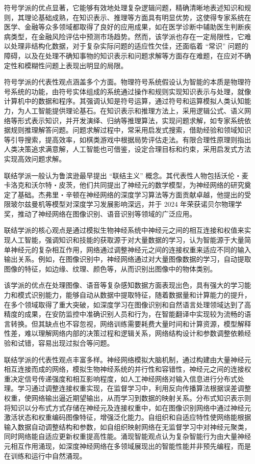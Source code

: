 符号学派的优点显著，它能够有效地处理复杂逻辑问题，精确清晰地表述知识和规则，其理论基础成熟，在知识表示、推理等方面具有明显优势，这使得专家系统在医学、金融等众多领域都取得了良好的应用成果，如在医学诊断中辅助医生判断疾病类型，在金融风险评估中预测市场趋势。然而，该学派也存在一定局限性，它难以处理非结构化数据，对于复杂实际问题的适应性欠佳，还面临着 “常识” 问题的障碍，以及在处理不确知事物的知识表示和问题求解等方面存在难题，在应对不确定性和模糊性问题上表现出明显的局限。


符号学派的代表性观点涵盖多个方面。物理符号系统假设认为智能的本质是物理符号系统的功能，由符号实体组成的系统通过操作和规则实现知识表示与处理，就像计算机中的数据和程序。其强调认知是符号运算，通过符号和运算模拟人类认知能力，为人工智能提供理论基石。在知识表示和推理方法上，采用逻辑公式、语义网络等形式表示知识，并开发演绎、归纳等推理算法，实现问题求解，如专家系统依据规则推理解答问题。问题求解过程中，常采用启发式搜索，借助经验和领域知识等引导搜索，提高效率，如棋类游戏中根据局势评估走法。有限合理性原理则指出人类决策追求满意解，人工智能也可借鉴，设定合理目标和约束，采用启发式方法实现高效问题求解。





联结学派一般认为鲁滨逊最早提出 “联结主义” 概念。其代表性人物包括沃伦・麦卡洛克和沃尔特・皮茨，他们共同提出了神经元的数学模型，为神经网络的研究奠定了基础。杰弗里・辛顿在神经网络的深度学习算法等方面贡献卓越，他提出的受限玻尔兹曼机等模型对深度学习发展影响深远，并于 2024 年荣获诺贝尔物理学奖，推动了神经网络在图像识别、语音识别等领域的广泛应用。


联结学派的核心观点是通过模拟生物神经系统中神经元之间的相互连接和权值来实现人工智能，强调知识和技能的获取源于对大量数据的学习，认为智能源于大量简单神经元的复杂相互作用，网络通过调整神经元之间的连接权重来适应不同的输入输出关系。例如，在图像识别中，神经网络通过对大量图像数据的学习，自动提取图像的特征，如边缘、纹理、颜色等，从而识别出图像中的物体类别。


该学派的优点在处理图像、语音等复杂感知数据方面表现出色，具有强大的学习能力和模式识别能力，能够自动从数据中提取特征，随着数据量和计算能力的提升，在多个领域取得了重大突破，如深度学习在图像识别和自然语言处理领域达到了高精度的成果，在安防监控中准确识别人员和行为，在智能翻译中实现较为流畅的语言转换。但其缺点也不容忽视，网络训练需要耗费大量时间和计算资源，模型解释性差，难以理解网络内部的决策过程和逻辑关系，网络结构设计和参数调整依赖经验和试错，容易出现过拟合等问题。


联结学派的代表性观点丰富多样。神经网络模拟大脑机制，通过构建由大量神经元相互连接而成的网络，模拟生物神经系统的并行性和容错性，神经元之间的连接权重决定信号传递强度和相互影响程度，如人工神经网络对输入信息进行分布式处理。学习通过调整连接权重实现，在监督学习中，利用反向传播算法根据误差调整权重，使网络输出逼近期望输出，从而学习到数据的映射关系。分布式知识表示则将知识以分布式方式存储在神经元及连接权重中，如在图像识别网络中通过神经元激活状态和权重编码图像特征，增强泛化能力。自组织和自适应特性使网络能根据输入数据自动调整结构和参数，如自组织映射网络在无监督学习中对神经元聚类，同时网络能自适应更新权重提高性能。涌现智能观点认为复杂智能行为由大量神经元相互作用涌现，如深度神经网络在多领域展现出的智能性能并非预先编程，而是在训练和运行中自然涌现。





